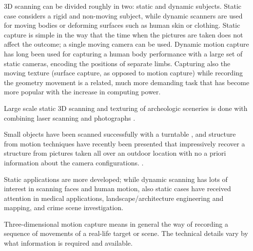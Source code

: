 
3D scanning can be divided roughly in two: static and dynamic subjects.
Static case considers a rigid and non-moving subject, while dynamic scanners are used for moving bodies or deforming surfaces such as human skin or clothing.
Static capture is simple in the way that the time when the pictures are taken does not affect the outcome; a single moving camera can be used.
Dynamic motion capture has long been used for capturing a human body performance with a large set of static cameras, encoding the positions of separate limbs.
Capturing also the moving texture (surface capture, as opposed to motion capture) while recording the geometry movement is a related, much more demanding task that has become more popular with the increase in computing power.



Large scale static 3D scanning and texturing of archeologic sceneries is done with combining laser scanning and photographs \cite{lerma2010terrestrial}.

Small objects have been scanned successfully with a turntable \cite{fitzgibbon1998automatic}, and structure from motion techniques have recently been presented that impressively recover a structure from pictures taken all over an outdoor location with no a priori information about the camera configurations. \cite{goesele2007multi,furukawa2010towards}.

Static applications are more developed; while dynamic scanning has lots of interest in scanning faces and human motion, also static cases have received attention in medical applications, landscape/architecture engineering and mapping, and crime scene investigation. %


Three-dimensional motion capture means in general the way of recording a sequence of movements of a real-life target or scene.
The technical details vary by what information is required and available.


